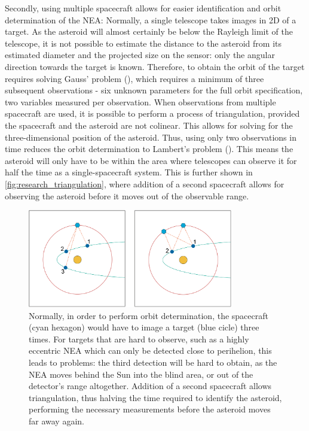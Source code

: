 Secondly, using multiple spacecraft allows for easier identification and orbit determination of the NEA: Normally, a single telescope takes images in 2D of a target. As the asteroid will almost certainly be below the Rayleigh limit of the telescope, it is not possible to estimate the distance to the asteroid from its estimated diameter and the projected size on the sensor: only the angular direction towards the target is known. Therefore, to obtain the orbit of the target requires solving Gauss' problem (\cite{OpNav}), which requires a minimum of three subsequent observations - six unknown parameters for the full orbit specification, two variables measured per observation. When observations from multiple spacecraft are used, it is possible to perform a process of triangulation, provided the spacecraft and the asteroid are not colinear. This allows for solving for the three-dimensional position of the asteroid. Thus, using only two observations in time reduces the orbit determination to Lambert's problem (\cite{triangulation}). This means the asteroid will only have to be within the area where telescopes can observe it for half the time as a single-spacecraft system. This is further shown in \autoref{fig:research_triangulation}, where addition of a second spacecraft allows for observing the asteroid before it moves out of the observable range.\\

\begin{figure}[htbp]
 \centering
 \includegraphics[width=0.8\textwidth]{img/research_triangulation.png}
 \caption{Normally, in order to perform orbit determination, the spacecraft (cyan hexagon) would have to image a target (blue cicle) three times. For targets that are hard to observe, such as a highly eccentric NEA which can only be detected close to perihelion, this leads to problems: the third detection will be hard to obtain, as the NEA moves behind the Sun into the blind area, or out of the detector's range altogether. Addition of a second spacecraft allows triangulation, thus halving the time required to identify the asteroid, performing the necessary measurements before the asteroid moves far away again.}
 \label{fig:research_triangulation}
\end{figure}



